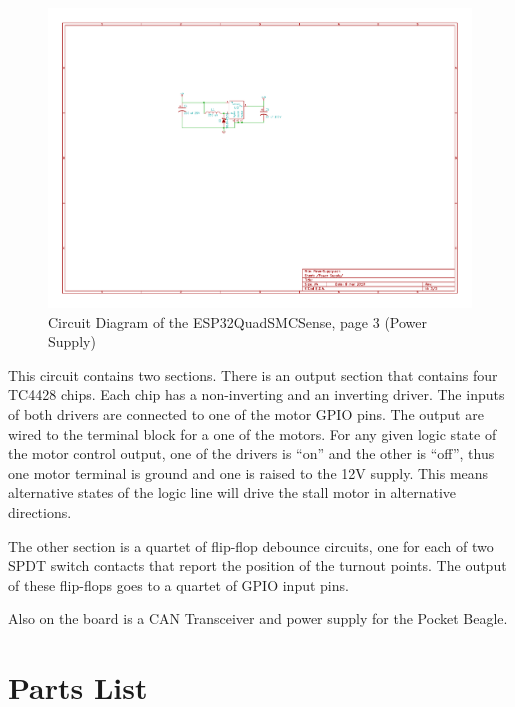 \begin{figure}[hbpt]\begin{centering}%
\includegraphics[width=5in]{ESP32QuadSMCSense-3.pdf}
\caption{Circuit Diagram of the ESP32QuadSMCSense, page 3 (Power Supply)}
\end{centering}\end{figure}
This circuit contains two sections.  There is an output section that contains 
four TC4428 chips.  Each chip has a non-inverting and an inverting driver. The 
inputs of both drivers are connected to one of the motor GPIO pins.  The 
output are wired to the terminal block for a one of the motors. For any given 
logic state of the motor control output, one of the drivers is ``on'' and the 
other is ``off'', thus one motor terminal is ground and one is raised to the 
12V supply.  This means alternative states of the logic line will drive the 
stall motor in alternative directions.

The other section is a quartet of flip-flop debounce circuits, one for each
of two SPDT switch contacts that report the position of the turnout points.
The output of these flip-flops goes to a quartet of GPIO input pins.

Also on the board is a CAN Transceiver and power supply for the Pocket Beagle.

\section{Parts List}

